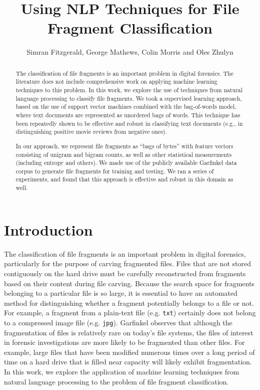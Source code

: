 \documentclass[letter,11pt]{article}
\title{Using NLP Techniques for File Fragment Classification}
\author{Simran Fitzgerald, George Mathews, Colin Morris and Oles Zhulyn}
\begin{document}
\maketitle

\begin{abstract}
The classification of file fragments is an important problem in digital forensics. The literature does not include comprehensive work on applying machine learning techniques to this problem. In this work, we explore the use of techniques from natural language processing to classify file fragments. We took a supervised learning approach, based on the use of support vector machines combined with the bag-of-words model, where text documents are represented as unordered bags of words. This technique has been repeatedly shown to be effective and robust in classifying text documents (e.g., in distinguishing positive movie reviews from negative ones).

In our approach, we represent file fragments as ``bags of bytes'' with feature vectors consisting of unigram and bigram counts, as well as other statistical measurements (including entropy and others). We made use of the publicly available Garfinkel data corpus to generate file fragments for training and testing. We ran a series of experiments, and found that this approach is effective and robust in this domain as well.
\end{abstract}

\section{Introduction}
\label{Section:Introduction}
The classification of file fragments is an important problem in digital forensics, particularly for the purpose of carving fragmented files. Files that are not stored contiguously on the hard drive must be carefully reconstructed from fragments based on their content during file carving. Because the search space for fragments belonging to a particular file is so large, it is essential to have an automated method for distinguishing whether a fragment potentially belongs to a file or not. For example, a fragment from a plain-text file (e.g. \texttt{txt}) certainly does not belong to a compressed image file (e.g. \texttt{jpg}). Garfinkel \cite{Garfinkel07} observes that although the fragmentation of files is relatively rare on today's file systems, the files of interest in forensic investigations are more likely to be fragmented than other files. For example, large files that have been modified numerous times over a long period of time on a hard drive that is filled near capacity will likely exhibit fragmentation. In this work, we explore the application of machine learning techniques from natural language processing to the problem of file fragment classification.
\end{document}
